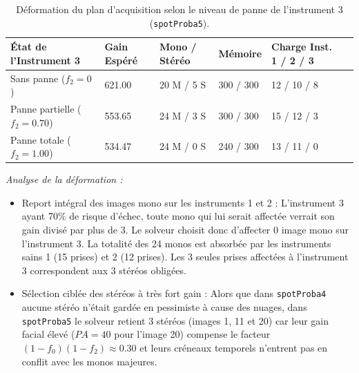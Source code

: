 \begin{table}[H]
\centering
\small
\begin{tabularx}{\textwidth}{lXXXXc}
\toprule
\textbf{État de l'Instrument 3} & \textbf{Gain Espéré} & \textbf{Mono / Stéréo} & \textbf{Mémoire} & \textbf{Charge Inst. 1 / 2 / 3} \\
\midrule
Sans panne ($f_2 = 0$) & 621.00 & 20 M / 5 S & 300 / 300 & 12 / 10 / 8 \\
Panne partielle ($f_2 = 0.70$) & 553.65 & 24 M / 3 S & 300 / 300 & 15 / 12 / 3 \\
Panne totale ($f_2 = 1.00$) & 534.47 & 24 M / 0 S & 240 / 300 & 13 / 11 / 0 \\
\bottomrule
\end{tabularx}
\caption{Déformation du plan d'acquisition selon le niveau de panne de l'instrument 3 (\texttt{spotProba5}).}
\label{tab:spot5_failure_impact}
\end{table}

\noindent\textit{Analyse de la déformation :}
\begin{itemize}
    \item Report intégral des images mono sur les instruments 1 et 2 : L'instrument 3 ayant 70\% de risque d'échec, toute mono qui lui serait affectée verrait son gain divisé par plus de 3. Le solveur choisit donc d'affecter 0 image mono sur l'instrument 3. La totalité des 24 monos est absorbée par les instruments sains 1 (15 prises) et 2 (12 prises). Les 3 seules prises affectées à l'instrument 3 correspondent aux 3 stéréos obligées.
    \item Sélection ciblée des stéréos à très fort gain : Alors que dans \texttt{spotProba4} aucune stéréo n'était gardée en pessimiste à cause des nuages, dans \texttt{spotProba5} le solveur retient 3 stéréos (images 1, 11 et 20) car leur gain facial élevé ($PA=40$ pour l'image 20) compense le facteur $(1-f_0)(1-f_2) \approx 0.30$ et leurs créneaux temporels n'entrent pas en conflit avec les monos majeures.
\end{itemize}

